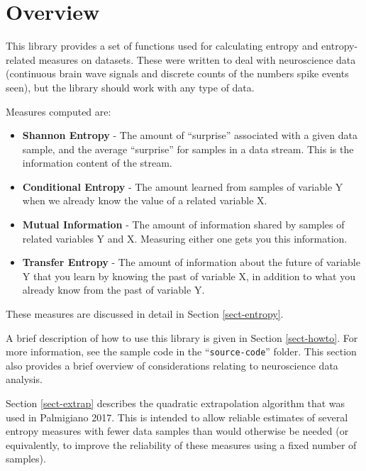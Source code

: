 
\chapter{Overview}
\label{sect-over}

This library provides a set of functions used for calculating entropy and
entropy-related measures on datasets. These were written to deal with
neuroscience data (continuous brain wave signals and discrete counts of
the numbers spike events seen), but the library should work with any type
of data.

Measures computed are:

\begin{itemize}
%
\item \textbf{Shannon Entropy} - The amount of ``surprise'' associated
with a given data sample, and the average ``surprise'' for samples in a
data stream. This is the information content of the stream.
%
\item \textbf{Conditional Entropy} - The amount learned from samples of
variable Y when we already know the value of a related variable X.
%
\item \textbf{Mutual Information} - The amount of information shared by
samples of related variables Y and X. Measuring either one gets you this
information.
%
\item \textbf{Transfer Entropy} - The amount of information about the
future of variable Y that you learn by knowing the past of variable X, in
addition to what you already know from the past of variable Y.
%
\end{itemize}

These measures are discussed in detail in Section \ref{sect-entropy}.

A brief description of how to use this library is given in Section
\ref{sect-howto}. For more information, see the sample code in the
``\verb|source-code|'' folder. This section also provides a brief overview
of considerations relating to neuroscience data analysis.

Section \ref{sect-extrap} describes the quadratic extrapolation algorithm
that was used in Palmigiano 2017. This is intended to allow reliable
estimates of several entropy measures with fewer data samples than would
otherwise be needed (or equivalently, to improve the reliability of these
measures using a fixed number of samples).

%
